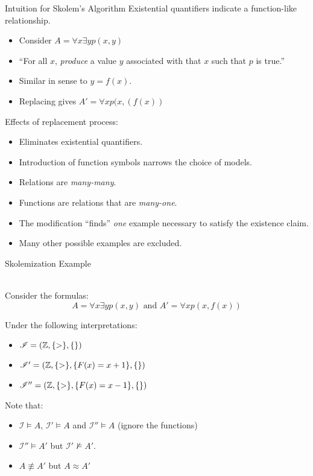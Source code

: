 \begin{wideslide}[bm=,toc=]{Intuition for Skolem's Algorithm}
Existential quantifiers indicate a function-like relationship.
\begin{itemize}
\item<2-> Consider $A = \forall x \exists y p(x,y)$
\item<3-> ``For all $x$, \emph{produce} a value $y$ associated with that $x$ such
     that $p$ is true.''
\item<4-> Similar in sense to $y = f(x)$.
\item<5-> Replacing gives $A' = \forall x p(x,(f(x))$
\end{itemize}
\vspace{2ex}
\pause[5]
Effects of replacement process:
\begin{itemize}
\item<7-> Eliminates existential quantifiers.
\item<8-> Introduction of function symbols narrows the choice of models.
\item<9-> Relations are \emph{many-many}.
\item<10-> Functions are relations that are \emph{many-one}.
\item<11-> The modification ``finds'' \emph{one} example necessary to satisfy the existence claim.
\item<12-> Many other possible examples are excluded.
\end{itemize}
\end{wideslide}

\begin{wideslide}[bm=,toc=]{Skolemization Example}
\begin{ex}{9.14}
~\\Consider the formulas:
\vspace{-2ex}
\[A = \forall x \exists y p(x,y) \text{ and } A' = \forall x p(x,f(x))\]
\end{ex}
\vspace{-2ex}
\pause
Under the following interpretations:
\begin{itemize}
\item<3-> $\mathcal{I} = (\mathbb{Z},\{>\},\{\})$
\item<4-> $\mathcal{I}' = (\mathbb{Z},\{>\},\{F(x) = x + 1\},\{\})$
\item<5-> $\mathcal{I}'' = (\mathbb{Z},\{>\},\{F(x) = x - 1\},\{\})$
\end{itemize}
\pause[4]
Note that:
\begin{itemize}
\item $\mathcal{I} \models A$, $\mathcal{I}' \models A$ and $\mathcal{I}''
\models A$ (ignore the functions)
\item $\mathcal{I}'' \models A'$ but $\mathcal{I}' \not \models A'$. 
\item $A \not \equiv A'$ but $A \approx A'$ 
\end{itemize}
\end{wideslide}

